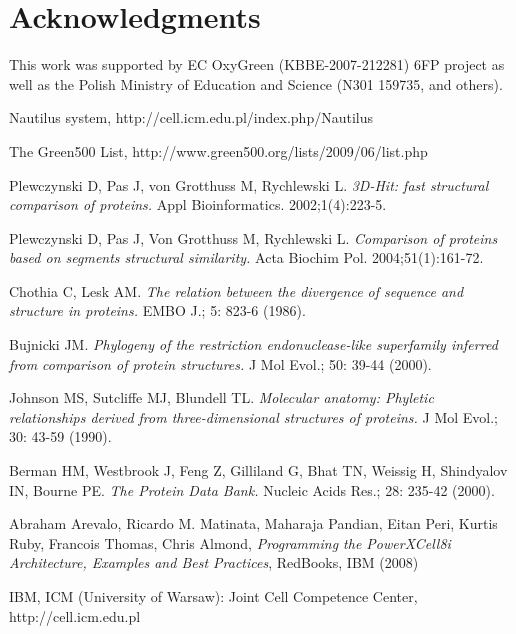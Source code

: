 \documentclass[envcountsame,envcountchap]{svmono}
\begin{document}
\section{Acknowledgments}
This work was supported by EC OxyGreen (KBBE-2007-212281) 6FP project as
well as the Polish Ministry of Education and Science (N301 159735,
and others).

\begin{thebibliography}{99}

 Nautilus system,
http://cell.icm.edu.pl/index.php/Nautilus

 The Green500 List,
http://www.green500.org/lists/2009/06/list.php

 Plewczynski D, Pas J, von Grotthuss M, Rychlewski L.
\textit{3D-Hit: fast structural comparison of proteins.}
Appl Bioinformatics. 2002;1(4):223-5.

  Plewczynski D, Pas J, Von Grotthuss M, Rychlewski L.
\textit{Comparison of proteins based on segments structural similarity.}
Acta Biochim Pol. 2004;51(1):161-72.

 Chothia C, Lesk AM. \textit{The relation between the
divergence of sequence and structure in proteins.} EMBO J.; 5: 823-6 (1986).

 Bujnicki JM. \textit{Phylogeny of the restriction
endonuclease-like superfamily inferred from comparison of protein structures.}
J Mol Evol.; 50: 39-44 (2000).

 Johnson MS, Sutcliffe MJ, Blundell TL. \textit{Molecular
anatomy: Phyletic relationships derived from three-dimensional structures of
proteins.} J Mol Evol.; 30: 43-59 (1990).

 Berman HM, Westbrook J, Feng Z, Gilliland G, Bhat TN,
Weissig H, Shindyalov IN, Bourne PE. \textit{The Protein Data Bank.}
Nucleic Acids Res.; 28: 235-42 (2000).

 Abraham Arevalo, Ricardo M. Matinata, Maharaja Pandian,
Eitan Peri, Kurtis Ruby, Francois Thomas, Chris Almond,
\textit{Programming the PowerXCell8i Architecture, Examples and Best Practices},
RedBooks, IBM (2008)

 IBM, ICM (University of Warsaw):
Joint Cell Competence Center, http://cell.icm.edu.pl




\end{thebibliography}
\end{document}
